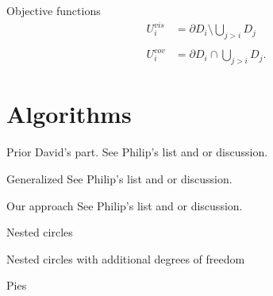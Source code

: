 \documentclass{beamer}
\begin{document}
\begin{frame}{Objective functions}
  \begin{align*}
  U_i^{vis} & =\partial D_i\setminus \bigcup_{j>i} D_{j} \\
  \\
  U_i^{cov} & =\partial D_i \cap \bigcup_{j>i} D_{j}.
  \end{align*}
\end{frame}

\section{Algorithms}

\begin{frame}{Prior}
  David's part. See Philip's list and or discussion.
\end{frame}

\begin{frame}{Generalized}
  See Philip's list and or discussion.
\end{frame}

\begin{frame}{Our approach}
  See Philip's list and or discussion.
\end{frame}

\begin{frame}{Nested circles}
\end{frame}

\begin{frame}{Nested circles with additional degrees of freedom}
\end{frame}

\begin{frame}{Pies}
\end{frame}
\end{document}
